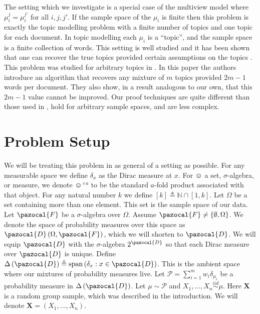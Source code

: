 \documentclass[aos]{imsart}
\def\sF{\pazocal{F}}
\def\sD{\pazocal{D}}
\def\sP{\mathscr{P}}
\def\bX{\mathbf{X}}
\def\dd{\Delta\left( \sD \right)}
\def\span{\operatorname{span}}
\def\simiid{\overset{iid}{\sim}}
\def\span{\operatorname{span}}
\theoremstyle{plain}
\theoremstyle{defintion}
\begin{document}
	The setting which we investigate is a special case of the multiview model where $\mu_i^j = \mu_i^{j'}$ for all $i,j,j'$. If the sample space of the $\mu_i$ is finite then this problem is exactly the topic modelling problem with a finite number of topics and one topic for each document. In topic modelling each $\mu_i$ is a ``topic'', and the sample space is a finite collection of words. This setting is well studied and it has been shown that one can recover the true topics provided certain assumptions on the topics \cite{allman09, anandkumar14, arora12}. This problem was studied for arbitrary topics in \cite{rabani13}. In this paper the authors introduce an algorithm that recovers any mixture of $m$ topics provided $2m-1$ words per document. They also show, in a result analogous to our own, that this $2m-1$ value cannot be improved. Our proof techniques are quite different than those used in \cite{rabani13}, hold for arbitrary sample spaces, and are less complex.
	\section{Problem Setup} 
	We will be treating this problem in as general of a setting as possible. For any measurable space we define $\delta_x$ as the Dirac measure at $x$. For $\smiley$ a set, $\sigma$-algebra, or measure, we denote $\smiley^{\times a}$ to be the standard $a$-fold product associated with that object. For any natural number $k$ we define $\left[ k \right] \triangleq \mathbb{N} \cap \left[ 1,k \right]$.
	Let $\Omega$ be a set containing more than one element. This set is the sample space of our data. Let $\sF$ be a $\sigma$-algebra over $\Omega$. Assume $\sF \neq \left\{ \emptyset, \Omega \right\}$. We denote the space of probability measures over this space as $\sD\left( \Omega,\sF \right)$, which we will shorten to $\sD$. We will equip $\sD$ with the $\sigma$-algebra $2^\sD$ so that each Dirac measure over $\sD$ is unique. Define $\dd \triangleq \span \left( \delta_x: x \in \sD \right)$. This is the ambient space where our mixtures of probability measures live. Let $\sP = \sum_{i=1}^m  w_i \delta_{\mu_i}$ be a probability measure in $\dd$. Let $\mu\sim \sP$ and $X_1 ,\ldots, X_n \simiid \mu$. Here $\bX$ is a random group sample, which was described in the introduction. We will denote $\bX = \left( X_1,\ldots,X_n \right)$.
\end{document}
